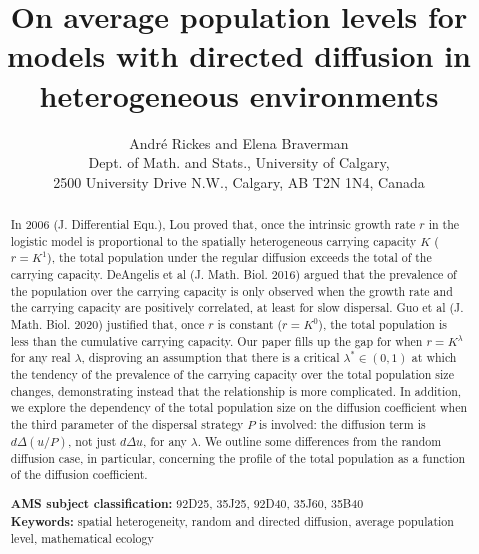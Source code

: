 \documentclass[11pt]{article}
\title{On average population levels for models with directed diffusion in heterogeneous environments}
\author{ André Rickes and Elena Braverman \\
Dept. of Math. and Stats., University of
Calgary, \\ 2500 University Drive N.W., Calgary, AB  T2N 1N4, Canada}
\theoremstyle{definition}
\theoremstyle{remark}
\begin{document}
\maketitle

\begin{abstract}
In 2006 (J. Differential  Equ.), Lou proved that, once the intrinsic growth rate $r$ in the logistic model is proportional to the  spatially heterogeneous carrying capacity $K$ ($r=K^1$), the total population under the regular diffusion exceeds the total of the carrying capacity.
DeAngelis et al (J. Math. Biol. 2016) argued that the prevalence of the population over the carrying capacity is only observed when   the growth rate and the carrying capacity are positively correlated, at least for slow dispersal. Guo et al (J. Math. Biol. 2020) justified that, once $r$ is constant ($r=K^0$), the total population is less than the cumulative carrying capacity. Our paper fills up the gap for when $r=K^{\lambda}$ for any real $\lambda$, disproving an assumption that there is a critical $\lambda^{\ast} \in (0,1)$ at which the tendency of the prevalence of the carrying capacity over the total population size changes, demonstrating instead that the relationship is more complicated.
In addition, we explore the dependency of the total population size on the diffusion coefficient when the third parameter of the dispersal strategy $P$ is involved: the diffusion term is $d \Delta(u/P)$, not just $d \Delta u$, for any $\lambda$. We outline some differences from the random diffusion case, in particular, concerning the profile of the total population as a function of the diffusion coefficient.



{\bf AMS subject classification:} 92D25, 35J25, 92D40, 35J60, 35B40
\\
{\bf Keywords:} spatial heterogeneity, random and directed diffusion, average population level, mathematical ecology
\end{abstract}
\end{document}
